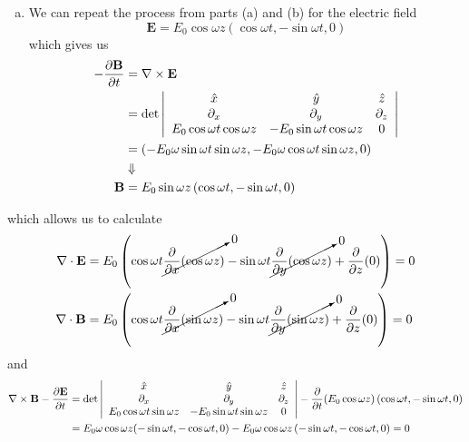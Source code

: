 \documentclass[11pt]{article}
\numberwithin{equation}{section}
\begin{document}
\begin{enumerate}[(a)]
\item
    We can repeat the process from parts (a) and (b) for the electric field
    \begin{equation}
        \mathbf{E} = E_0\cos\omega{z}\left(\cos\omega{t},-\sin\omega{t},0\right)
    \label{Prob2c}
    \end{equation}
    which gives us 
    \begin{align*}
        -\frac{\partial{\mathbf{B}}}{\partial{t}} &= \bold\nabla\times\mathbf{E} \\
                                  &= \det\left|\begin{array}{ccc}
                                                \hat{x}                       &\hat{y}                        &\hat{z}\\
                                                \partial_{x}                  &\partial_{y}                   &\partial_{z}\\
                                                E_0\cos\omega{t}\cos\omega{z} &-E_0\sin\omega{t}\cos\omega{z} &0
                                          \end{array}\right|\\
                                   &= (-E_0\omega\sin\omega{t}\sin\omega{z}, -E_0\omega\cos\omega{t}\sin\omega{z}, 0)\\
                                   &\Downarrow\\
                                          \mathbf{B} &= E_0\sin\omega{z}\left(\cos\omega{t}, -\sin\omega{t}, 0\right)
    \end{align*}
\end{enumerate}
   which allows us to calculate 
   \begin{align*}
       \bold\nabla\cdot\mathbf{E} &= E_0\left(\cos\omega{t}\cancelto{0}{\frac{\partial{}}{\partial{x}}(\cos\omega{z})} - \sin\omega{t}\cancelto{0}{\frac{\partial{}}{\partial{y}}(\cos\omega{z})} + \frac{\partial{}}{\partial{z}}(0)\right) = 0\\
       \bold\nabla\cdot\mathbf{B} &= E_0\left( \cos\omega{t}\cancelto{0}{\frac{\partial{}}{\partial{x}}(\sin\omega{z})} - \sin\omega{t}\cancelto{0}{\frac{\partial{}}{\partial{y}}(\sin\omega{z})} + \frac{\partial{}}{\partial{z}}(0)\right) = 0
   \end{align*}
   and
    \begin{align*}
        \bold\nabla\times\mathbf{B} - \frac{\partial{\mathbf{E}}}{\partial{t}} &= \det\left|\begin{array}{ccc}
                                                \hat{x}                       &\hat{y}                        &\hat{z}\\
                                                \partial_{x}                  &\partial_{y}                   &\partial_{z}\\
                                                E_0\cos\omega{t}\sin\omega{z} &-E_0\sin\omega{t}\sin\omega{z} &0 
    \end{array}\right| - \frac{\partial{}}{\partial{t}}(E_0\cos\omega{z})\left(\cos\omega{t},-\sin\omega{t},0\right)\\
    &= E_0\omega\cos\omega{z}(-\sin\omega{t},-\cos\omega{t},0) - E_0\omega\cos\omega{z}\left(-\sin\omega{t},-\cos\omega{t},0\right) = 0
    \end{align*}
\end{document}
